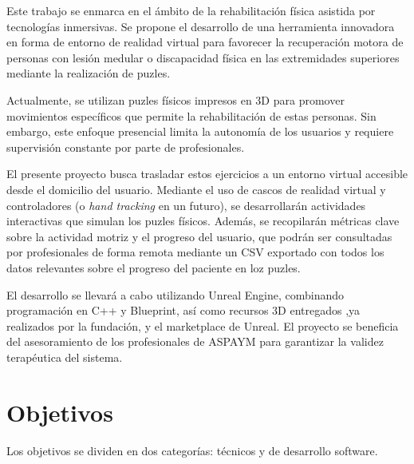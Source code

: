 
Este trabajo se enmarca en el ámbito de la rehabilitación física asistida por tecnologías inmersivas. Se propone el desarrollo de una herramienta innovadora en forma de entorno de realidad virtual para favorecer la recuperación motora de personas con lesión medular o discapacidad física en las extremidades superiores mediante la realización de puzles.

Actualmente, se utilizan puzles físicos impresos en 3D para promover movimientos específicos que permite la rehabilitación de estas personas. Sin embargo, este enfoque presencial limita la autonomía de los usuarios y requiere supervisión constante por parte de profesionales.

El presente proyecto busca trasladar estos ejercicios a un entorno virtual accesible desde el domicilio del usuario. Mediante el uso de cascos de realidad virtual y controladores (o \textit{hand tracking} en un futuro), se desarrollarán actividades interactivas que simulan los puzles físicos. Además, se recopilarán métricas clave sobre la actividad motriz y el progreso del usuario, que podrán ser consultadas por profesionales de forma remota mediante un CSV exportado con todos los datos relevantes sobre el progreso del paciente en loz puzles.

El desarrollo se llevará a cabo utilizando Unreal Engine, combinando programación en C++ y Blueprint, así como recursos 3D entregados ,ya realizados por la fundación, y el marketplace de Unreal. El proyecto se beneficia del asesoramiento de los profesionales de ASPAYM para garantizar la validez terapéutica del sistema.

\section{Objetivos}
Los objetivos se dividen en dos categorías: técnicos y de desarrollo software.

